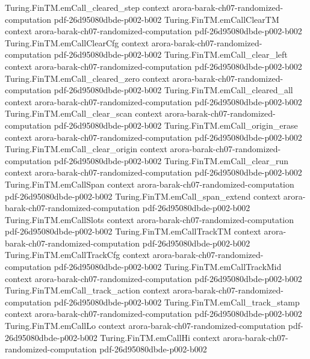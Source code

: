 \begin{theorem}
\proofstep
  {Turing.FinTM.emCall_cleared_step}
  {context}
  {arora-barak-ch07-randomized-computation}
  {pdf-26d95080dbde-p002-b002}
\proofstep
  {Turing.FinTM.emCallClearTM}
  {context}
  {arora-barak-ch07-randomized-computation}
  {pdf-26d95080dbde-p002-b002}
\proofstep
  {Turing.FinTM.emCallClearCfg}
  {context}
  {arora-barak-ch07-randomized-computation}
  {pdf-26d95080dbde-p002-b002}
\proofstep
  {Turing.FinTM.emCall_clear_left}
  {context}
  {arora-barak-ch07-randomized-computation}
  {pdf-26d95080dbde-p002-b002}
\proofstep
  {Turing.FinTM.emCall_cleared_zero}
  {context}
  {arora-barak-ch07-randomized-computation}
  {pdf-26d95080dbde-p002-b002}
\proofstep
  {Turing.FinTM.emCall_cleared_all}
  {context}
  {arora-barak-ch07-randomized-computation}
  {pdf-26d95080dbde-p002-b002}
\proofstep
  {Turing.FinTM.emCall_clear_scan}
  {context}
  {arora-barak-ch07-randomized-computation}
  {pdf-26d95080dbde-p002-b002}
\proofstep
  {Turing.FinTM.emCall_origin_erase}
  {context}
  {arora-barak-ch07-randomized-computation}
  {pdf-26d95080dbde-p002-b002}
\proofstep
  {Turing.FinTM.emCall_clear_origin}
  {context}
  {arora-barak-ch07-randomized-computation}
  {pdf-26d95080dbde-p002-b002}
\proofstep
  {Turing.FinTM.emCall_clear_run}
  {context}
  {arora-barak-ch07-randomized-computation}
  {pdf-26d95080dbde-p002-b002}
\proofstep
  {Turing.FinTM.emCallSpan}
  {context}
  {arora-barak-ch07-randomized-computation}
  {pdf-26d95080dbde-p002-b002}
\proofstep
  {Turing.FinTM.emCall_span_extend}
  {context}
  {arora-barak-ch07-randomized-computation}
  {pdf-26d95080dbde-p002-b002}
\proofstep
  {Turing.FinTM.emCallSlots}
  {context}
  {arora-barak-ch07-randomized-computation}
  {pdf-26d95080dbde-p002-b002}
\proofstep
  {Turing.FinTM.emCallTrackTM}
  {context}
  {arora-barak-ch07-randomized-computation}
  {pdf-26d95080dbde-p002-b002}
\proofstep
  {Turing.FinTM.emCallTrackCfg}
  {context}
  {arora-barak-ch07-randomized-computation}
  {pdf-26d95080dbde-p002-b002}
\proofstep
  {Turing.FinTM.emCallTrackMid}
  {context}
  {arora-barak-ch07-randomized-computation}
  {pdf-26d95080dbde-p002-b002}
\proofstep
  {Turing.FinTM.emCall_track_action}
  {context}
  {arora-barak-ch07-randomized-computation}
  {pdf-26d95080dbde-p002-b002}
\proofstep
  {Turing.FinTM.emCall_track_stamp}
  {context}
  {arora-barak-ch07-randomized-computation}
  {pdf-26d95080dbde-p002-b002}
\proofstep
  {Turing.FinTM.emCallLo}
  {context}
  {arora-barak-ch07-randomized-computation}
  {pdf-26d95080dbde-p002-b002}
\proofstep
  {Turing.FinTM.emCallHi}
  {context}
  {arora-barak-ch07-randomized-computation}
  {pdf-26d95080dbde-p002-b002}

\end{theorem}
